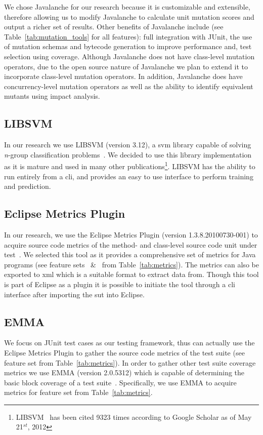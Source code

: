 We chose Javalanche for our research because it is customizable and extensible, therefore allowing us to modify Javalanche to calculate unit mutation scores and output a richer set of results. Other benefits of Javalanche include (see Table~\ref{tab:mutation_tools} for all features): full integration with JUnit, the use of mutation schemas and bytecode generation to improve performance and, test selection using coverage. Although Javalanche does not have class-level mutation operators, due to the open source nature of Javalanche we plan to extend it to incorporate class-level mutation operators. In addition, Javalanche does have concurrency-level mutation operators as well as the ability to identify equivalent mutants using impact analysis.


\subsection{LIBSVM}
\label{subsec:approach_libsvm}
In our research we use LIBSVM (version 3.12), a \gls{svm} library capable of solving \emph{n}-group classification problems~\cite{CL11}. We decided to use this library implementation as it is mature and used in many other publications\footnote{LIBSVM~\cite{CL11} has been cited 9323 times according to Google Scholar as of May 21$^{st}$, 2012}. LIBSVM has the ability to run entirely from a \gls{cli}, and provides an easy to use interface to perform training and prediction.


\subsection{Eclipse Metrics Plugin}
\label{subsec:approach_metrics_plugin}
In our research, we use the Eclipse Metrics Plugin (version 1.3.8.20100730-001) to acquire source code metrics of the method- and class-level source code unit under test~\cite{Metrics}. We selected this tool as it provides a comprehensive set of metrics for Java programs (see feature sets ~\&~ from Table~\ref{tab:metrics}). The metrics can also be exported to \gls{xml} which is a suitable format to extract data from. Though this tool is part of Eclipse as a plugin it is possible to initiate the tool through a \gls{cli} interface after importing the \gls{sut} into Eclipse.


\subsection{EMMA}
\label{subsec:approach_emma}
We focus on JUnit test cases as our testing framework, thus can actually use the Eclipse Metrics Plugin to gather the source code metrics of the test suite (see feature set  from Table~\ref{tab:metrics}). In order to gather other test suite coverage metrics we use EMMA (version 2.0.5312) which is capable of determining the basic block coverage of a test suite~\cite{EMMA}. Specifically, we use EMMA to acquire metrics for feature set  from Table~\ref{tab:metrics}.


